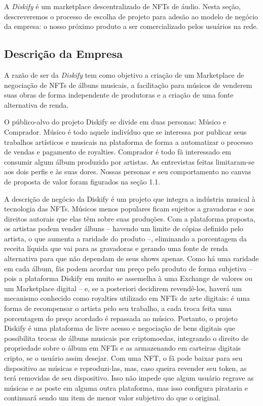 \documentclass[onecolumn,12pt]{asme2ej}
\begin{document}
A {\it Diskify} é um marketplace descentralizado de NFTs de áudio. Nesta seção, descreveremos o processo de escolha de projeto para adesão ao modelo de negócio da empresa: o nosso próximo produto a ser comercializado pelos usuários na rede.
 
\subsection{Descrição da Empresa}

A razão de ser da {\it Diskify} tem como objetivo a criação de um Marketplace de negociação de NFTs de álbuns musicais, a facilitação para músicos de venderem suas obras de forma independente de produtoras e a criação de uma fonte alternativa de renda.  

O público-alvo do projeto Diskify se divide em duas personas: Músico e Comprador. Músico é todo aquele indivíduo que se interessa por publicar seus trabalhos artísticos e musicais na plataforma de forma a automatizar o processo de vendas e pagamento de royalties. Comprador é todo fã interessado em consumir algum álbum produzido por artistas. As entrevistas feitas limitaram-se aos dois perfis e às suas dores. Nossas personas e seu comportamento no canvas de proposta de valor foram figurados na seção 1.1.

A descrição de negócio da Diskify é um projeto que integra a indústria musical à tecnologia das NFTs. Músicos menos populares ficam sujeitos a gravadoras e aos direitos autorais que elas têm sobre suas produções. Com a plataforma proposta, os artistas podem vender álbuns – havendo um limite de cópias definido pelo artista, o que aumenta a raridade do produto –, eliminando a porcentagem da receita líquida que vai para as gravadoras e gerando uma fonte de renda alternativa para que não dependam de seus shows apenas. Como há uma raridade em cada álbum, fãs podem acordar um preço pelo produto de forma subjetiva – pois a plataforma Diskify em muito se assemelha à uma Exchange de valores ou um Marketplace digital – e, se a posteriori decidirem revendê-los, haverá um mecanismo conhecido como royalties utilizado em NFTs de arte digitais: é uma forma de recompensar o artista pelo seu trabalho, a cada troca feita uma porcentagem do preço acordado é repassada ao músico. Portanto, o projeto Diskify é uma plataforma de livre acesso e negociação de bens digitais que possibilita trocas de álbuns musicais por criptomoedas, integrando o direito de propriedade sobre o álbum em NFTs e as armazenando em carteiras digitais cripto, se o usuário assim desejar. Com uma NFT, o fã pode baixar para seu dispositivo as músicas e reproduzi-las, mas, caso queira revender seu token, as terá removidas de seu dispositivo. Isso não impede que algum usuário regrave as músicas e as poste em alguma outra plataforma, mas isso configura pirataria e continuará sendo um item de menor valor subjetivo do que o original. 
\end{document}
